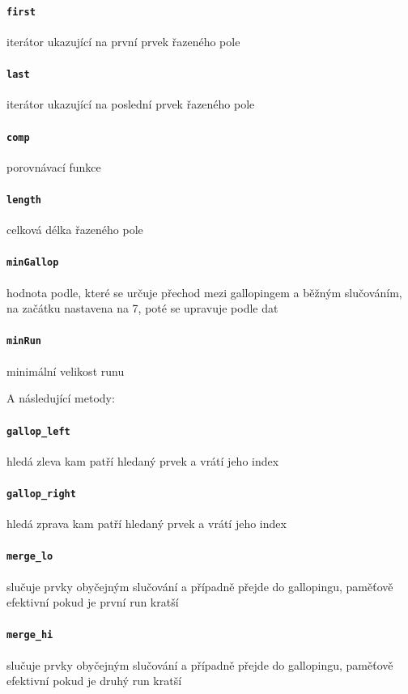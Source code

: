\documentclass[thesis=B,czech]{FITthesis}[2019/12/23]
\begin{document}
\paragraph{\texttt{first}}{iterátor ukazující na první prvek řazeného pole}
\paragraph{\texttt{last}}{iterátor ukazující na poslední prvek řazeného pole}
\paragraph{\texttt{comp}}{porovnávací funkce}
\paragraph{\texttt{length}}{celková délka řazeného pole}
\paragraph{\texttt{minGallop}}{hodnota podle, které se určuje přechod mezi gallopingem a běžným slučováním, na začátku nastavena na 7, poté se upravuje podle dat}
\paragraph{\texttt{minRun}}{minimální velikost runu}

A následující metody:

\paragraph{\texttt{gallop\_left}}{hledá zleva kam patří hledaný prvek a vrátí jeho index}
\paragraph{\texttt{gallop\_right}}{hledá zprava kam patří hledaný prvek a vrátí jeho index}
\paragraph{\texttt{merge\_lo}}{slučuje prvky obyčejným slučování a případně přejde do gallopingu, paměťově efektivní pokud je první run kratší}
\paragraph{\texttt{merge\_hi}}{slučuje prvky obyčejným slučování a případně přejde do gallopingu, paměťově efektivní pokud je druhý run kratší}
\end{document}
